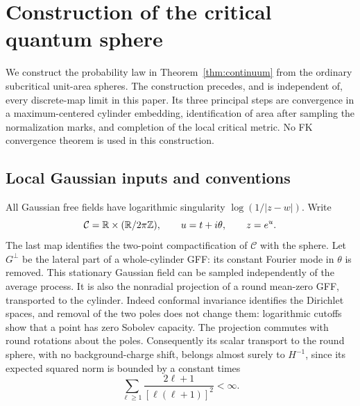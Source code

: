 \section{Construction of the critical quantum sphere}\label{sec:continuum}

We construct the probability law in Theorem~\ref{thm:continuum} from the
ordinary subcritical unit-area spheres.  The construction precedes, and is
independent of, every discrete-map limit in this paper.  Its three principal
steps are convergence in a maximum-centered cylinder embedding, identification
of area after sampling the normalization marks, and completion of the local
critical metric.  No FK convergence theorem is used in this construction.

\subsection{Local Gaussian inputs and conventions}\label{cont:local-inputs}

All Gaussian free fields have logarithmic singularity
$\log(1/|z-w|)$.  Write
\[
 \mathcal C=\mathbb R\times(\mathbb R/2\pi\mathbb Z),\qquad u=t+i\theta,
 \qquad z=e^u.
\]
The last map identifies the two-point compactification of $\mathcal C$ with
the sphere.  Let $G^\perp$ be the lateral part of a whole-cylinder GFF: its
constant Fourier mode in $\theta$ is removed.  This stationary Gaussian field
can be sampled independently of the average process.  It is also the
nonradial projection of a round mean-zero GFF, transported to the cylinder.
Indeed conformal invariance identifies the Dirichlet spaces, and removal of
the two poles does not change them: logarithmic cutoffs show that a point has
zero Sobolev capacity.  The projection commutes with round rotations about the
poles.  Consequently its scalar transport to the round sphere, with no
background-charge shift, belongs almost surely to $H^{-1}$, since its expected
squared norm is bounded by a constant times
\[
 \sum_{\ell\geq1}\frac{2\ell+1}{[\ell(\ell+1)]^2}<\infty.
\]

